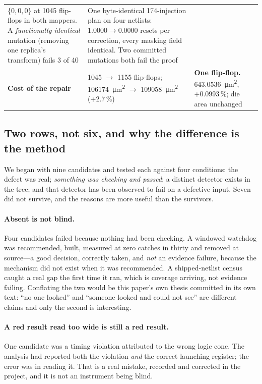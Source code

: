 \documentclass[11pt,a4paper]{article}
\begin{document}
\begin{table}[htbp]
\begin{tabularx}{\textwidth}{L{2.4cm}XX}
$\{0,0,0\}$ at \num{1045} flip-flops in both mappers. A
\emph{functionally identical} mutation (removing one replica's transform)
fails 3 of 40 &
One byte-identical 174-injection plan on four netlists:
$1.0000 \to 0.0000$ resets per correction, every masking field identical.
Two committed mutations both fail the proof \\
\addlinespace
\textbf{Cost of the repair} &
\num{1045} $\to$ \num{1155} flip-flops;
\SI{106174}{\micro\meter\squared} $\to$
\SI{109058}{\micro\meter\squared} (+2.7\,\%) &
\textbf{One flip-flop.}
\SI{643.0536}{\micro\meter\squared}, +0.0993\,\%; die area unchanged \\
\bottomrule
\end{tabularx}
\end{table}

\subsection{Two rows, not six, and why the difference is the method}

We began with nine candidates and tested each against four conditions:
the defect was real; \emph{something was checking and passed}; a distinct
detector exists in the tree; and that detector has been observed to fail
on a defective input. Seven did not survive, and the reasons are more
useful than the survivors.

\paragraph{Absent is not blind.}
Four candidates failed because nothing had been checking. A windowed
watchdog was recommended, built, measured at zero catches in thirty and
removed at source---a good decision, correctly taken, and \emph{not} an
evidence failure, because the mechanism did not exist when it was
recommended. A shipped-netlist census caught a real gap the first time it
ran, which is coverage arriving, not evidence failing. Conflating the two
would be this paper's own thesis committed in its own text: ``no one
looked'' and ``someone looked and could not see'' are different claims
and only the second is interesting.

\paragraph{A red result read too wide is still a red result.}
One candidate was a timing violation attributed to the wrong logic cone.
The analysis had reported both the violation \emph{and} the correct
launching register; the error was in reading it. That is a real mistake,
recorded and corrected in the project, and it is not an instrument being
blind.
\end{document}
